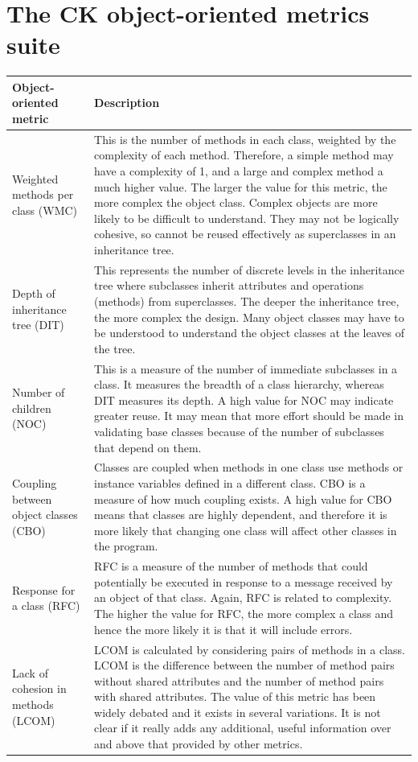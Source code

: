 \section {The CK object-oriented metrics suite}
\begin{table}[h!]
\centering
\begin{tabular}{ |p{3cm}|p{8cm}| }
  \hline
Object-oriented metric & Description\\
\hline
\hline
Weighted methods per class (WMC) & This is the number of methods in each class, weighted by the complexity of each method. Therefore, a simple method may have a complexity of 1, and a large and complex method a much higher value. The larger the value for this metric, the more complex the object class. Complex objects are more likely to be difficult to understand. They may not be logically cohesive, so cannot be reused effectively as superclasses in an inheritance tree.\\
\hline
Depth of inheritance tree (DIT) & This represents the number of discrete levels in the inheritance tree where subclasses inherit attributes and operations (methods) from superclasses. The deeper the inheritance tree, the more complex the design. Many object classes may have to be understood to understand the object classes at the leaves of the tree.\\
\hline
Number of children (NOC) & This is a measure of the number of immediate subclasses in a class. It measures the breadth of a class hierarchy, whereas DIT measures its depth. A high value for NOC may indicate greater reuse. It may mean that more effort should be made in validating base classes because of the number of subclasses that depend on them.\\
\hline
Coupling between object classes (CBO) & Classes are coupled when methods in one class use methods or instance variables defined in a different class. CBO is a measure of how much coupling exists. A high value for CBO means that classes are highly dependent, and therefore it is more likely that changing one class will affect other classes in the program.\\
\hline
Response for a class (RFC) & RFC is a measure of the number of methods that could potentially be executed in response to a message received by an object of that class. Again, RFC is related to complexity. The higher the value for RFC, the more complex a class and hence the more likely it is that it will include errors.\\
\hline
Lack of cohesion in methods (LCOM) & LCOM is calculated by considering pairs of methods in a class. LCOM is the difference between the number of method pairs without shared attributes and the number of method pairs with shared attributes. The value of this metric has been widely debated and it exists in several variations. It is not clear if it really adds any additional, useful information over and above that provided by other metrics.\\
\hline
\end{tabular}

\label{table:T7_5}
\end{table}
